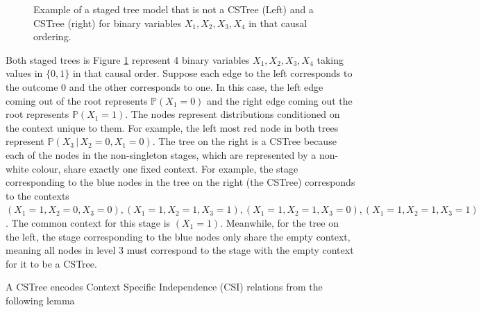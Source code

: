 \documentclass{tufte-book}
\begin{document}
\begin{figure}[!h]\label{fig:cstreestagedtree}
   \begin{floatrow}
%
\caption{Example of a staged tree model that is not a CSTree (Left) and a CSTree (right) for binary variables $X_1,X_2,X_3,X_4$ in that causal ordering.}
        
   \end{floatrow}
\end{figure}

Both staged trees is Figure \ref{fig:cstreestagedtree} represent 4 binary variables \(X_1,X_2,X_3,X_4\) taking values in \(\{0,1\}\) in that causal order. Suppose each edge to the left corresponds to the outcome 0 and the other corresponds to one. In this case, the left edge coming out of the root represents \(\mathbb{P}(X_1 = 0)\) and the right edge coming out the root represents \(\mathbb{P}(X_1 = 1)\). The nodes represent distributions conditioned on the context unique to them. For example, the left most red node in both trees represent \(\mathbb{P}(X_3 \,|\, X_2=0, X_1=0)\). The tree on the right is a CSTree because each of the nodes in the non-singleton stages, which are represented by a non-white colour, share exactly one fixed context. For example, the stage corresponding to the blue nodes in the tree on the right (the CSTree) corresponds to the contexts \((X_1=1, X_2=0, X_3=0), (X_1=1, X_2=1, X_3=1), (X_1=1, X_2=1, X_3=0), (X_1=1, X_2=1, X_3=1)\). The common context for this stage is  \((X_1=1)\). Meanwhile, for the tree on the left, the stage corresponding to the blue nodes only share the empty context, meaning all nodes in level 3 must correspond to the stage with the empty context for it to be a CSTree.


A CSTree encodes Context Specific Independence (CSI) relations from the following lemma \cite{duarte-2021-repres-learn}
\end{document}
